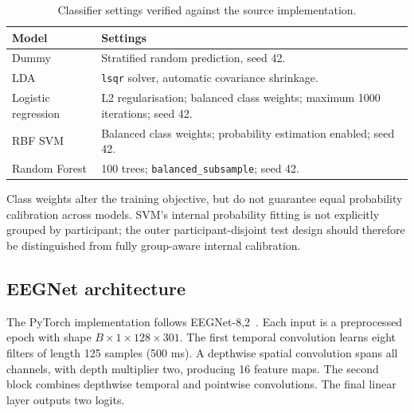 \documentclass[11pt,a4paper]{article}
\newcommand{\code}[1]{\nolinkurl{#1}}
\begin{document}
\begin{table}[htbp]\centering
\small
\caption{Classifier settings verified against the source implementation.}
\label{tab:settings}
\begin{tabularx}{\linewidth}{lY}
\toprule
Model & Settings\\\midrule
Dummy & Stratified random prediction, seed 42.\\
LDA & \code{lsqr} solver, automatic covariance shrinkage.\\
Logistic regression & L2 regularisation; balanced class weights; maximum 1000 iterations; seed 42.\\
RBF SVM & Balanced class weights; probability estimation enabled; seed 42.\\
Random Forest & 100 trees; \code{balanced_subsample}; seed 42.\\\bottomrule
\end{tabularx}
\end{table}

Class weights alter the training objective, but do not guarantee equal probability calibration across models. SVM's internal probability fitting is not explicitly grouped by participant; the outer participant-disjoint test design should therefore be distinguished from fully group-aware internal calibration.

\subsection{EEGNet architecture}
The PyTorch implementation follows EEGNet-8,2~\cite{eegnet}. Each input is a preprocessed epoch with shape $B\times1\times128\times301$. The first temporal convolution learns eight filters of length 125 samples (500 ms). A depthwise spatial convolution spans all channels, with depth multiplier two, producing 16 feature maps. The second block combines depthwise temporal and pointwise convolutions. The final linear layer outputs two logits.
\end{document}
